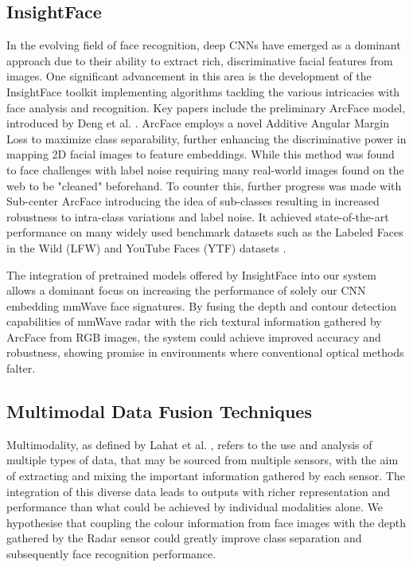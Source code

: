 \documentclass{interim}
\begin{document}
\subsection{InsightFace}
In the evolving field of face recognition, deep CNNs have emerged as a dominant approach due to their ability to extract rich, discriminative facial features from images. One significant advancement in this area is the development of the InsightFace toolkit implementing algorithms tackling the various intricacies with face analysis and recognition. Key papers include the preliminary ArcFace model, introduced by Deng et al. \cite{deng2018arcface}. ArcFace employs a novel Additive Angular Margin Loss to maximize class separability, further enhancing the discriminative power in mapping 2D facial images to feature embeddings. While this method was found to face challenges with label noise requiring many real-world images found on the web to be "cleaned" beforehand. To counter this, further progress was made with Sub-center ArcFace \cite{deng2020subcenter} introducing the idea of sub-classes resulting in increased robustness to intra-class variations and label noise. It achieved state-of-the-art performance on many widely used benchmark datasets such as the Labeled Faces in the Wild (LFW) \cite{huang2008labeled} and YouTube Faces (YTF) datasets \cite{wolf2011face}.

The integration of pretrained models offered by InsightFace into our system allows a dominant focus on increasing the performance of solely our CNN embedding mmWave face signatures. By fusing the depth and contour detection capabilities of mmWave radar with the rich textural information gathered by ArcFace from RGB images, the system could achieve improved accuracy and robustness, showing promise in environments where conventional optical methods falter.

\subsection{Multimodal Data Fusion Techniques}
Multimodality, as defined by Lahat et al. \cite{lahat2015multimodal}, refers to the use and analysis of multiple types of data, that may be sourced from multiple sensors, with the aim of extracting and mixing the important information gathered by each sensor. The integration of this diverse data leads to outputs with richer representation and performance than what could be achieved by individual modalities alone. We hypothesise that coupling the colour information from face images with the depth gathered by the Radar sensor could greatly improve class separation and subsequently face recognition performance.
\end{document}

